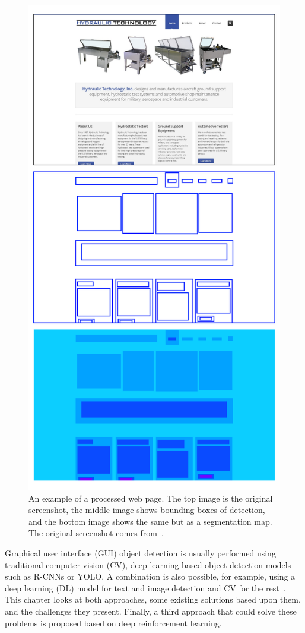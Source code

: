 \documentclass[
  digital,     %
  oneside,     %
  nosansbold,  %
  nocolorbold, %
  lof,         %
  lot,         %
]{fithesis4}
\begin{document}
\begin{figure}
    \centering
    \includegraphics[width=0.7\linewidth]{diagrams/result_example.pdf}
    \caption{An example of a processed web page. The top image is the original screenshot, the middle image shows bounding boxes of detection, and the bottom image shows the same but as a segmentation map. The original screenshot comes from~\cite{aydos2020}.}
    \label{fig:example-result}
\end{figure}

Graphical user interface (GUI) object detection is usually performed using traditional computer vision (CV), deep learning-based object detection models such as R-CNNs or YOLO. A combination is also possible, for example, using a deep learning (DL) model for text and image detection and CV for the rest~\cite{ODforGUI_CV_DL_or_both}. This chapter looks at both approaches, some existing solutions based upon them, and the challenges they present. Finally, a third approach that could solve these problems is proposed based on deep reinforcement learning.
\end{document}
